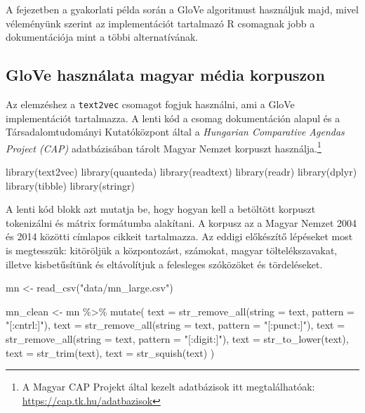 \documentclass[
]{book}
\newenvironment{Shaded}{\begin{snugshade}}{\end{snugshade}}
\newcommand{\AttributeTok}[1]{\textcolor[rgb]{0.77,0.63,0.00}{#1}}
\newcommand{\FunctionTok}[1]{\textcolor[rgb]{0.00,0.00,0.00}{#1}}
\newcommand{\NormalTok}[1]{#1}
\newcommand{\OtherTok}[1]{\textcolor[rgb]{0.56,0.35,0.01}{#1}}
\newcommand{\SpecialCharTok}[1]{\textcolor[rgb]{0.00,0.00,0.00}{#1}}
\newcommand{\StringTok}[1]{\textcolor[rgb]{0.31,0.60,0.02}{#1}}
\begin{document}
A fejezetben a gyakorlati példa során a GloVe algoritmust használjuk
majd, mivel véleményünk szerint az implementációt tartalmazó R csomagnak
jobb a dokumentációja mint a többi alternatívának.

\hypertarget{glove-hasznuxe1lata-magyar-muxe9dia-korpuszon}{%
\subsection{GloVe használata magyar média
korpuszon}\label{glove-hasznuxe1lata-magyar-muxe9dia-korpuszon}}

Az elemzéshez a \texttt{text2vec} csomagot fogjuk használni, ami a GloVe
implementációt tartalmazza. A lenti kód a csomag dokumentáción alapul és
a Társadalomtudományi Kutatóközpont által a \emph{Hungarian Comparative
Agendas Project (CAP)} adatbázisában tárolt Magyar Nemzet korpuszt
használja.\footnote{A Magyar CAP Projekt által kezelt adatbázisok itt
  megtalálhatóak: \url{https://cap.tk.hu/adatbazisok}}

\begin{Shaded}
\begin{Highlighting}[]
\FunctionTok{library}\NormalTok{(text2vec)}
\FunctionTok{library}\NormalTok{(quanteda)}
\FunctionTok{library}\NormalTok{(readtext)}
\FunctionTok{library}\NormalTok{(readr)}
\FunctionTok{library}\NormalTok{(dplyr)}
\FunctionTok{library}\NormalTok{(tibble)}
\FunctionTok{library}\NormalTok{(stringr)}
\end{Highlighting}
\end{Shaded}

A lenti kód blokk azt mutatja be, hogy hogyan kell a betöltött korpuszt
tokenizálni és mátrix formátumba alakítani. A korpusz az a Magyar Nemzet
2004 és 2014 közötti címlapos cikkeit tartalmazza. Az eddigi előkészítő
lépéseket most is megtesszük: kitöröljük a központozást, számokat,
magyar töltelékszavakat, illetve kisbetűsítünk és eltávolítjuk a
felesleges szóközöket és tördeléseket.

\begin{Shaded}
\begin{Highlighting}[]
\NormalTok{mn }\OtherTok{\textless{}{-}} \FunctionTok{read\_csv}\NormalTok{(}\StringTok{"data/mn\_large.csv"}\NormalTok{)}

\NormalTok{mn\_clean }\OtherTok{\textless{}{-}}\NormalTok{ mn }\SpecialCharTok{\%\textgreater{}\%}
  \FunctionTok{mutate}\NormalTok{(}
    \AttributeTok{text =} \FunctionTok{str\_remove\_all}\NormalTok{(}\AttributeTok{string =}\NormalTok{ text, }\AttributeTok{pattern =} \StringTok{"[:cntrl:]"}\NormalTok{),}
    \AttributeTok{text =} \FunctionTok{str\_remove\_all}\NormalTok{(}\AttributeTok{string =}\NormalTok{ text, }\AttributeTok{pattern =} \StringTok{"[:punct:]"}\NormalTok{),}
    \AttributeTok{text =} \FunctionTok{str\_remove\_all}\NormalTok{(}\AttributeTok{string =}\NormalTok{ text, }\AttributeTok{pattern =} \StringTok{"[:digit:]"}\NormalTok{),}
    \AttributeTok{text =} \FunctionTok{str\_to\_lower}\NormalTok{(text),}
    \AttributeTok{text =} \FunctionTok{str\_trim}\NormalTok{(text),}
    \AttributeTok{text =} \FunctionTok{str\_squish}\NormalTok{(text)}
\NormalTok{  )}
\end{Highlighting}
\end{Shaded}
\end{document}
